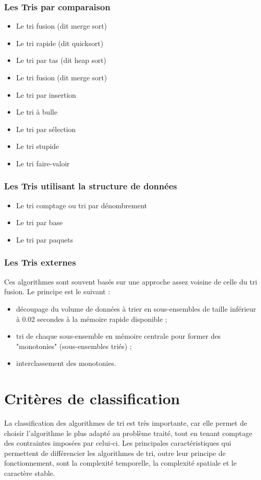 \documentclass[11pt,a4paper]{article}
\begin{document}
\subsubsection{Les Tris par comparaison}
\begin{itemize}
    \item Le tri fusion (dit merge sort)
    \item Le tri rapide (dit quicksort)
    \item Le tri par tas (dit heap sort)
    \item Le tri fusion (dit merge sort)
    \item Le tri par insertion
    \item Le tri à bulle
    \item Le tri par sélection
    \item Le tri stupide
    \item Le tri faire-valoir
\end{itemize}
\newpage
\subsubsection{Les Tris utilisant la structure de données}
\begin{itemize}
    \item Le tri comptage ou tri par dénombrement
    \item Le tri par base
    \item Le tri par paquets
\end{itemize}

\subsubsection{Les Tris externes}
Ces algorithmes sont souvent basés sur une approche assez voisine de celle du tri fusion. Le principe est le suivant :
\vspace{0.2cm}

\begin{itemize}
    \item découpage du volume de données à trier en sous-ensembles de taille inférieur à 0.02 secondes  à la mémoire rapide disponible ;
    \item tri de chaque sous-ensemble en mémoire centrale pour former des "monotonies" (sous-ensembles triés) ;
    \item interclassement des monotonies.
\end{itemize}

\section{Critères de classification}
La classification des algorithmes de tri est très importante, car elle permet de choisir l’algorithme le plus adapté au problème traité,
tout en tenant comptage des contraintes imposées par celui-ci. Les principales caractéristiques qui permettent de différencier les algorithmes
de tri, outre leur principe de fonctionnement, sont la complexité temporelle, la complexité spatiale et le caractère stable.
\end{document}
